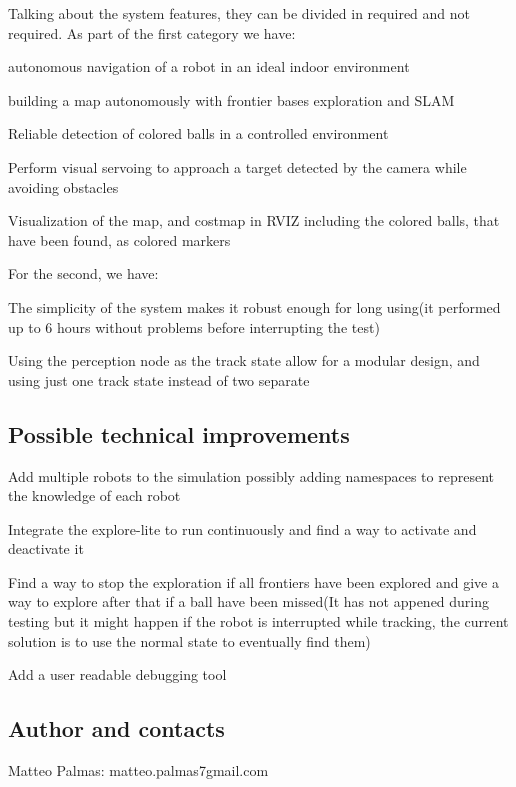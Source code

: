 Talking about the system features, they can be divided in required and not required. As part of the first category we have\+:
\begin{DoxyItemize}
\item autonomous navigation of a robot in an ideal indoor environment
\item building a map autonomously with frontier bases exploration and S\+L\+AM
\item Reliable detection of colored balls in a controlled environment
\item Perform visual servoing to approach a target detected by the camera while avoiding obstacles
\item Visualization of the map, and costmap in R\+V\+IZ including the colored balls, that have been found, as colored markers
\end{DoxyItemize}

For the second, we have\+:
\begin{DoxyItemize}
\item The simplicity of the system makes it robust enough for long using(it performed up to 6 hours without problems before interrupting the test)
\item Using the perception node as the track state allow for a modular design, and using just one track state instead of two separate
\end{DoxyItemize}

\subsection*{Possible technical improvements}


\begin{DoxyItemize}
\item Add multiple robots to the simulation possibly adding namespaces to represent the knowledge of each robot
\item Integrate the explore-\/lite to run continuously and find a way to activate and deactivate it
\item Find a way to stop the exploration if all frontiers have been explored and give a way to explore after that if a ball have been missed(\+It has not appened during testing but it might happen if the robot is interrupted while tracking, the current solution is to use the normal state to eventually find them)
\item Add a user readable debugging tool
\end{DoxyItemize}

\subsection*{Author and contacts}

Matteo Palmas\+: matteo.\+palmas7gmail.\+com 